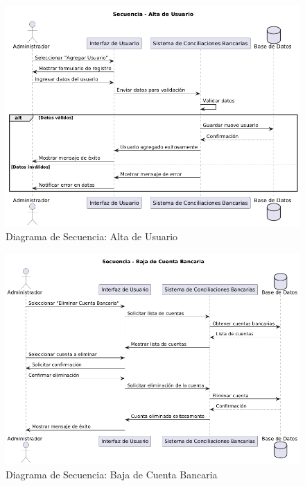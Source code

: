 \documentclass{article}
\begin{document}
\begin{figure}
    \centering
    \includegraphics[width=\textwidth]{secuencia/AltaDeUsuario.png}
    \caption{Diagrama de Secuencia: Alta de Usuario}
\end{figure}

\begin{figure}
    \centering
    \includegraphics[width=\textwidth]{secuencia/BajaDeCuentaBancaria.png}
    \caption{Diagrama de Secuencia: Baja de Cuenta Bancaria}
\end{figure}
\end{document}
